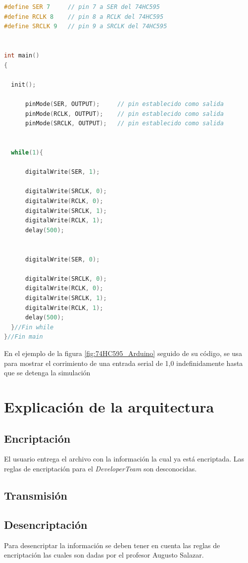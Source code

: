 \documentclass{article}
\begin{document}
\begin{lstlisting}[language=c,commentstyle=\color{miverde},basicstyle=\ttfamily,caption= Código C++,frame=single,]


#define SER 7     // pin 7 a SER del 74HC595
#define RCLK 8    // pin 8 a RCLK del 74HC595
#define SRCLK 9   // pin 9 a SRCLK del 74HC595


int main()
{

  init();
    
      pinMode(SER, OUTPUT);		// pin establecido como salida
      pinMode(RCLK, OUTPUT);	// pin establecido como salida
      pinMode(SRCLK, OUTPUT);	// pin establecido como salida
      
  
  while(1){
    
      digitalWrite(SER, 1);
      
      digitalWrite(SRCLK, 0);
      digitalWrite(RCLK, 0);
      digitalWrite(SRCLK, 1);
      digitalWrite(RCLK, 1);
      delay(500);
      
      
      digitalWrite(SER, 0);
     
      digitalWrite(SRCLK, 0);
      digitalWrite(RCLK, 0);
      digitalWrite(SRCLK, 1);
      digitalWrite(RCLK, 1);
      delay(500);
  }//Fin while
}//Fin main


\end{lstlisting}

En el ejemplo de la figura \ref{fig:74HC595_Arduino} seguido de su código, se usa para mostrar el corrimiento de una entrada serial de 1,0 indefinidamente hasta que se detenga la simulación




\section{Explicación de la arquitectura} 
\subsection{Encriptación}
El usuario entrega el archivo con la información la cual ya está encriptada. Las reglas de encriptación para el \textit{DeveloperTeam} son desconocidas.

\subsection{Transmisión}

\subsection{Desencriptación}
Para desencriptar la información se deben tener en cuenta las reglas de encriptación las cuales son dadas por el profesor Augusto Salazar.
\end{document}
